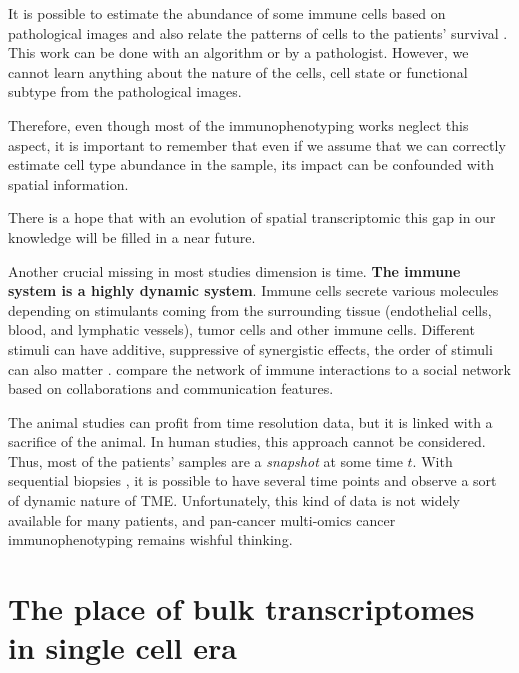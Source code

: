 \documentclass[12pt,]{book}
\theoremstyle{definition}
\theoremstyle{definition}
\theoremstyle{definition}
\theoremstyle{remark}
\begin{document}
It is possible to estimate the abundance of some immune cells based on
pathological images and also relate the patterns of cells to the
patients' survival \citep{Saltz2018}. This work can be done with an
algorithm or by a pathologist. However, we cannot learn anything about
the nature of the cells, cell state or functional subtype from the
pathological images.

Therefore, even though most of the immunophenotyping works
\citep{Charoentong2017, Angelova2015, Thorsson2018} neglect this aspect,
it is important to remember that even if we assume that we can correctly
estimate cell type abundance in the sample, its impact can be confounded
with spatial information.

There is a hope that with an evolution of spatial transcriptomic
\citep{Stahl2016, Svensson2018, Svensson2018b, Moncada2018} this gap in
our knowledge will be filled in a near future.

Another crucial missing in most studies dimension is time. \textbf{The
immune system is a highly dynamic system}. Immune cells secrete various
molecules depending on stimulants coming from the surrounding tissue
(endothelial cells, blood, and lymphatic vessels), tumor cells and other
immune cells. Different stimuli can have additive, suppressive of
synergistic effects, the order of stimuli can also matter
\citep{Touzot2014}. \citet{Bergthaler2017} compare the network of immune
interactions to a social network based on collaborations and
communication features.

The animal studies can profit from time resolution data, but it is
linked with a sacrifice of the animal. In human studies, this approach
cannot be considered. Thus, most of the patients' samples are a
\emph{snapshot} at some time \(t\). With sequential biopsies
\citep{Dowlati2001, Gomez-Roca2012, Roh2017}, it is possible to have
several time points and observe a sort of dynamic nature of TME.
Unfortunately, this kind of data is not widely available for many
patients, and pan-cancer multi-omics cancer immunophenotyping remains
wishful thinking.

\hypertarget{the-place-of-bulk-transcriptomes-in-single-cell-era}{%
\section{The place of bulk transcriptomes in single cell
era}\label{the-place-of-bulk-transcriptomes-in-single-cell-era}}
\end{document}
